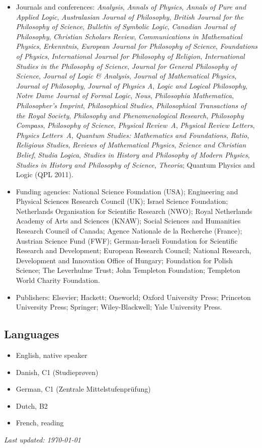 \documentclass[11pt]{article}
\newcommand{\journal}[1]{\textit{#1}}
\begin{document}
\begin{itemize}
\item Journals and conferences: \journal{Analysis}, \journal{Annals of
    Physics}, \journal{Annals of Pure and Applied Logic},
  \journal{Australasian Journal of Philosophy}, \journal{British Journal for
    the Philosophy of Science}, \journal{Bulletin of Symbolic Logic},
  \journal{Canadian Journal of Philosophy}, \journal{Christian Scholars
    Review}, \journal{Communications in Mathematical Physics},
  \journal{Erkenntnis}, \journal{European Journal for Philosophy of Science},
  \journal{Foundations of Physics}, \journal{International Journal for
    Philosophy of Religion}, \journal{International Studies in the Philosophy
    of Science}, \journal{Journal for General Philosophy of Science},
  \journal{Journal of Logic \& Analysis}, \journal{Journal of Mathematical
    Physics}, \journal{Journal of Philosophy}, \journal{Journal of Physics A},
  \journal{Logic and Logical Philosophy}, \journal{Notre Dame Journal of
    Formal Logic}, \journal{Nous}, \journal{Philosophia Mathematica},
  \journal{Philosopher's Imprint}, \journal{Philosophical Studies},
  \journal{Philosophical Transactions of the Royal Society},
  \journal{Philosophy and Phenomenological Research}, \journal{Philosophy
    Compass}, \journal{Philosophy of Science}, \journal{Physical Review~A},
  \journal{Physical Review Letters}, \journal{Physics Letters~A},
  \journal{Quantum Studies: Mathematics and Foundations}, \journal{Ratio},
  \journal{Religious Studies}, \journal{Reviews of Mathematical Physics},
  \journal{Science and Christian Belief}, \journal{Studia Logica},
  \journal{Studies in History and Philosophy of Modern Physics},
  \journal{Studies in History and Philosophy of Science}, \journal{Theoria};
  Quantum Physics and Logic (QPL 2011).
\item Funding agencies: National Science Foundation (USA); Engineering and
  Physical Sciences Research Council (UK); Israel Science Foundation;
  Netherlands Organisation for Scientific Research (NWO); Royal Netherlands
  Academy of Arts and Sciences (KNAW); Social Sciences and Humanities Research
  Council of Canada; Agence Nationale de la Recherche (France); Austrian
  Science Fund (FWF); German-Israeli Foundation for Scientific Research and
  Development; European Research Council; National Research, Development and
  Innovation Office of Hungary; Foundation for Polish Science; The Leverhulme
  Trust; John Templeton Foundation; Templeton World Charity Foundation.
\item Publishers: Elsevier; Hackett; Oneworld; Oxford University Press;
  Princeton University Press; Springer; Wiley-Blackwell; Yale University
  Press.
\end{itemize}


\subsection*{Languages}

\begin{itemize}
\item English, native speaker
\item Danish, C1 (Studieprøven)
\item German, C1 (Zentrale Mittelstufenprüfung)
\item Dutch, B2
\item French, reading
\end{itemize}


\vspace{2em} \hfill \textit{Last updated: \today}
\end{document}
